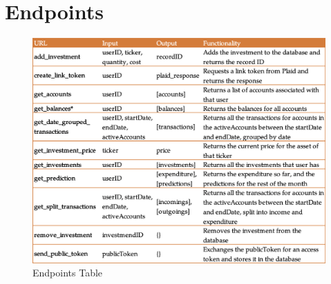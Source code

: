 \section{Endpoints}
\begin{figure}
	\centering
	\includegraphics[width=\textwidth]{images/endpoints.png}
	\caption{Endpoints Table}
	\label{fig:Endpoints}
\end{figure}
